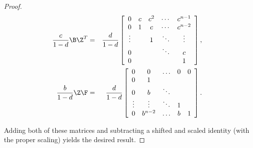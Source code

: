 \begin{proof}
\begin{eqnarray*} \label{eq:shiftFandB}
\frac{c}{1-d}\B\Z^T &=&
\frac{d}{1-d}
\left[
\begin{array}{ccccc}
 0     & c & c^2 & \cdots  & c^{n-1}  \\
 0     & 1 & c   & \cdots  & c^{n-2}  \\
\vdots &   & 1   & \ddots  & \vdots   \\
 0     &   &     & \ddots  & c        \\
 0     &   &     &         & 1        \\
\end{array}
\right],\\
\frac{b}{1-d}\Z\F&=&
\frac{d}{1-d}
\left[
\begin{array}{ccccc}
0      & 0       & \hdots  &   0     & 0  \\
0      & 1       &         &         &    \\
0      & b       & \ddots  &         &    \\
\vdots & \vdots  & \ddots  &   1     &    \\
0      & b^{n-2} & \hdots  &   b     & 1  \\
\end{array}
\right].
\end{eqnarray*}

Adding both of these matrices and subtracting a shifted and scaled identity
(with the proper scaling) yields the desired result.
\end{proof}
